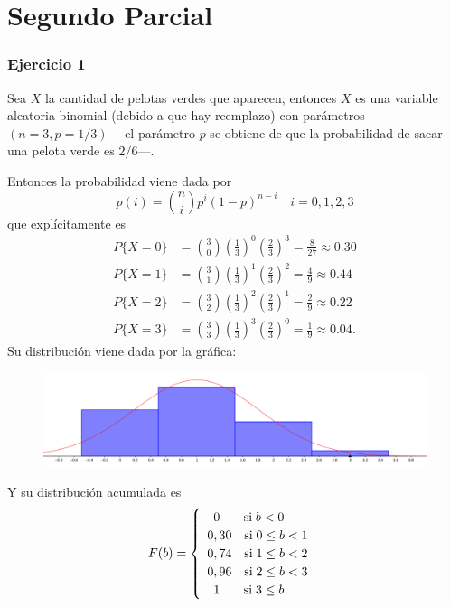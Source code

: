 

	\thispagestyle{plain}
\chapter*{Segundo Parcial}
\subsection*{Ejercicio 1}
\begin{sol}
	Sea $X$ la cantidad de pelotas verdes que aparecen, entonces $X$ es una variable aleatoria binomial (debido a que hay reemplazo) con parámetros $(n=3,p=1/3)$ ---el parámetro $p$ se obtiene de que la probabilidad de sacar una pelota verde es $2/6$---.
	
	Entonces la probabilidad viene dada por
	\begin{equation}
		p(i) = \binom{n}{i}p^i(1-p)^{n-i} \quad i=0,1,2,3
	\end{equation}
	que explícitamente es
	\begin{align*}
		P\{X=0\}  &= \binom{3}{0} \left(\frac 13\right)^0 \left(\frac 23\right)^3 = \frac{8}{27} \approx 0.30 \\
		P\{X=1\}  &= \binom{3}{1} \left(\frac 13\right)^1 \left(\frac 23\right)^2 = \frac{4}{9} \approx 0.44 \\
		P\{X=2\}  &= \binom{3}{2} \left(\frac 13\right)^2 \left(\frac 23\right)^1 = \frac{2}{9} \approx 0.22 \\
		P\{X=3\}  &= \binom{3}{3} \left(\frac 13\right)^3 \left(\frac 23\right)^0 = \frac{1}{9} \approx 0.04. 
	\end{align*}
	Su distribución viene dada por la gráfica:
	\begin{figure}[H]
		\includegraphics[width=0.6\linewidth]{pics/p1}
		\centering
	\end{figure}
	\noindent Y su distribución acumulada es
	\[ 
	F(b) = \begin{cases}
		  \hspace{1em} 0 \hspace{1.9em} \text{si} \; b<0 \\
		  \hspace{.5em} 0,30 \quad \text{si} \; 0 \leq b < 1\\
		  \hspace{.5em} 0,74 \quad \text{si} \; 1\leq b < 2\\
		  \hspace{.5em} 0,96 \quad \text{si} \; 2\leq b < 3\\
		  \hspace{1em} 1 \hspace{1.9em} \text{si} \; 3\leq b 
		   \end{cases}
	\]

\end{sol}
